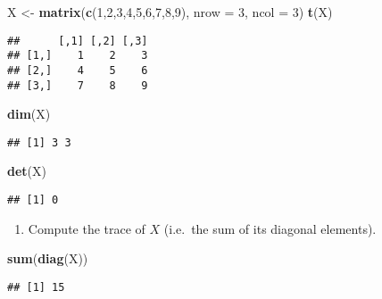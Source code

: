 \documentclass[]{article}
\newenvironment{Shaded}{\begin{snugshade}}{\end{snugshade}}
\newcommand{\KeywordTok}[1]{\textcolor[rgb]{0.13,0.29,0.53}{\textbf{#1}}}
\newcommand{\DataTypeTok}[1]{\textcolor[rgb]{0.13,0.29,0.53}{#1}}
\newcommand{\DecValTok}[1]{\textcolor[rgb]{0.00,0.00,0.81}{#1}}
\newcommand{\StringTok}[1]{\textcolor[rgb]{0.31,0.60,0.02}{#1}}
\newcommand{\NormalTok}[1]{#1}
\providecommand{\tightlist}{%
  \setlength{\itemsep}{0pt}\setlength{\parskip}{0pt}}
\begin{document}
\begin{Shaded}
\begin{Highlighting}[]
\NormalTok{X <-}\StringTok{ }\KeywordTok{matrix}\NormalTok{(}\KeywordTok{c}\NormalTok{(}\DecValTok{1}\NormalTok{,}\DecValTok{2}\NormalTok{,}\DecValTok{3}\NormalTok{,}\DecValTok{4}\NormalTok{,}\DecValTok{5}\NormalTok{,}\DecValTok{6}\NormalTok{,}\DecValTok{7}\NormalTok{,}\DecValTok{8}\NormalTok{,}\DecValTok{9}\NormalTok{), }\DataTypeTok{nrow =} \DecValTok{3}\NormalTok{, }\DataTypeTok{ncol =} \DecValTok{3}\NormalTok{)}
\KeywordTok{t}\NormalTok{(X)}
\end{Highlighting}
\end{Shaded}

\begin{verbatim}
##      [,1] [,2] [,3]
## [1,]    1    2    3
## [2,]    4    5    6
## [3,]    7    8    9
\end{verbatim}

\begin{Shaded}
\begin{Highlighting}[]
\KeywordTok{dim}\NormalTok{(X)}
\end{Highlighting}
\end{Shaded}

\begin{verbatim}
## [1] 3 3
\end{verbatim}

\begin{Shaded}
\begin{Highlighting}[]
\KeywordTok{det}\NormalTok{(X)}
\end{Highlighting}
\end{Shaded}

\begin{verbatim}
## [1] 0
\end{verbatim}

\begin{enumerate}
\def\labelenumi{\arabic{enumi}.}
\setcounter{enumi}{1}
\tightlist
\item
  Compute the trace of \(X\) (i.e.~the sum of its diagonal elements).
\end{enumerate}

\begin{Shaded}
\begin{Highlighting}[]
\KeywordTok{sum}\NormalTok{(}\KeywordTok{diag}\NormalTok{(X))}
\end{Highlighting}
\end{Shaded}

\begin{verbatim}
## [1] 15
\end{verbatim}
\end{document}
